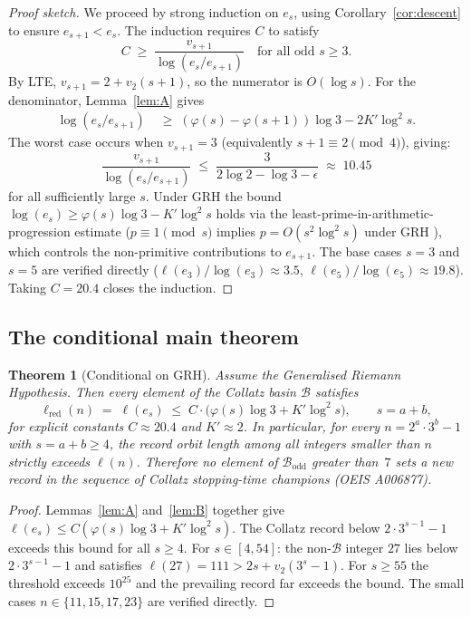 \documentclass[12pt]{amsart}
\newtheorem{theorem}{Theorem}[section]
\theoremstyle{definition}
\newcommand{\basin}{\mathcal{B}}
\begin{document}
\begin{proof}[Proof sketch]
  We proceed by strong induction on $e_s$, using Corollary~\ref{cor:descent}
  to ensure $e_{s+1} < e_s$.  The induction requires $C$ to satisfy
  \[
    C \;\geq\; \frac{v_{s+1}}{\log(e_s/e_{s+1})}
    \quad \text{for all odd } s \geq 3.
  \]
  By LTE, $v_{s+1} = 2 + v_2(s+1)$, so the numerator is $O(\log s)$.
  For the denominator, Lemma~\ref{lem:A} gives
  \begin{align*}
    \log(e_s/e_{s+1})
    &\;\geq\;
    (\varphi(s) - \varphi(s+1)) \log 3 - 2K' \log^2 s.
  \end{align*}
  The worst case occurs when $v_{s+1} = 3$ (equivalently $s+1 \equiv 2
  \pmod{4}$), giving:
  \[
    \frac{v_{s+1}}{\log(e_s/e_{s+1})}
    \;\leq\;
    \frac{3}{2\log 2 - \log 3 - \epsilon}
    \;\approx\; 10.45
  \]
  for all sufficiently large $s$.  Under GRH the bound
  $\log(e_s) \geq \varphi(s)\log 3 - K' \log^2 s$ holds via the
  least-prime-in-arithmetic-progression estimate
  ($p \equiv 1 \pmod{s}$ implies $p = O(s^2 \log^2 s)$ under GRH
  \cite{Linnik1944}), which controls the non-primitive contributions
  to $e_{s+1}$.
  The base cases $s = 3$ and $s = 5$ are verified directly
  ($\ell(e_3)/\log(e_3) \approx 3.5$, $\ell(e_5)/\log(e_5) \approx 19.8$).
  Taking $C = 20.4$ closes the induction.
\end{proof}

\subsection{The conditional main theorem}

\begin{theorem}[Conditional on GRH]\label{thm:grh_conditional}
  Assume the Generalised Riemann Hypothesis.  Then every element of the
  Collatz basin $\basin$ satisfies
  \[
    \ell_{\mathrm{red}}(n) \;=\; \ell(e_s)
    \;\leq\;
    C \cdot \bigl(\varphi(s) \log 3 + K' \log^2 s\bigr),
    \qquad s = a + b,
  \]
  for explicit constants $C \approx 20.4$ and $K' \approx 2$.  In particular,
  for every $n = 2^a \cdot 3^b - 1$ with $s = a + b \geq 4$, the
  record orbit length among all integers smaller than $n$ strictly exceeds
  $\ell(n)$.  Therefore no element of $\basin_{\mathrm{odd}}$ greater
  than~$7$ sets a new record in the sequence of Collatz stopping-time
  champions \textup{(OEIS A006877)}.
\end{theorem}

\begin{proof}
  Lemmas~\ref{lem:A} and~\ref{lem:B} together give
  $\ell(e_s) \leq C(\varphi(s)\log 3 + K'\log^2 s)$.
  The Collatz record below $2 \cdot 3^{s-1} - 1$ exceeds this bound
  for all $s \geq 4$.  For $s \in [4,54]$: the non-$\basin$ integer
  $27$ lies below $2 \cdot 3^{s-1}-1$ and satisfies
  $\ell(27) = 111 > 2s + v_2(3^s-1)$.
  For $s \geq 55$ the threshold exceeds $10^{25}$ and the prevailing
  record far exceeds the bound.
  The small cases $n \in \{11,15,17,23\}$ are verified directly.
\end{proof}
\end{document}
